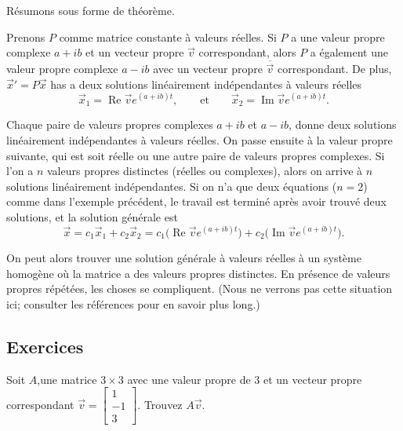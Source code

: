 \medskip

Résumons sous forme de théorème.

\begin{theorem}
Prenons $P$ comme matrice constante à valeurs réelles. Si $P$ a une valeur propre complexe $a+ib$ et un vecteur propre
$\vec{v}$ correspondant, alors $P$ a également une valeur propre complexe $a-ib$ avec un vecteur propre $\overline{\vec{v}}$ correspondant.
De plus,
${\vec{x}}' = P\vec{x}$ has
a deux solutions linéairement indépendantes à valeurs réelles
\begin{equation*}
\vec{x}_1 = \operatorname{Re} \vec{v} e^{(a+ib)t} ,
\qquad
\text{et}
\qquad
\vec{x}_2 = \operatorname{Im} \vec{v} e^{(a+ib)t} .
\end{equation*}
\end{theorem}

Chaque paire de valeurs propres complexes $a+ib$ et $a-ib$,
donne deux solutions linéairement indépendantes à valeurs réelles. On passe ensuite à la valeur propre suivante, qui est soit réelle ou une autre paire de valeurs propres complexes. Si l'on a $n$ valeurs propres distinctes (réelles ou complexes), alors on arrive à $n$ solutions linéairement indépendantes. Si on n’a que deux équations ($n=2$) comme dans l'exemple précédent, le travail est terminé après avoir trouvé deux solutions, et la solution générale est
\begin{equation*}
\vec{x} =
c_1 \vec{x}_1 + c_2 \vec{x}_2
= 
c_1 \bigl( \operatorname{Re} \vec{v} e^{(a+ib)t} \bigr) +
c_2 \bigl( \operatorname{Im} \vec{v} e^{(a+ib)t} \bigr)
.
\end{equation*}

On peut alors trouver une solution générale à valeurs réelles à un système homogène où la matrice a des valeurs propres distinctes. En présence de valeurs propres répétées, les choses se compliquent.  
(Nous ne verrons pas cette situation ici; consulter les références pour en savoir plus long.)

\subsection{Exercices}

\begin{exercise}[facile]
Soit $A$,une matrice $3 \times 3$ avec une valeur propre de 3 et un vecteur propre correspondant $\vec{v} =
\left[ \begin{smallmatrix} 1 \\ -1 \\ 3 \end{smallmatrix} \right]$.
Trouvez $A \vec{v}$.
\end{exercise}

